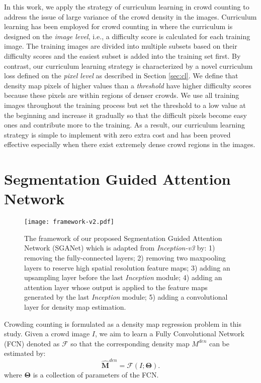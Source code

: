\documentclass[journal,comsoc]{IEEEtran}
\begin{document}
In this work, we apply the strategy of curriculum learning in crowd counting to address the issue of large variance of the crowd density in the images. Curriculum learning has been employed for crowd counting in \cite{liu2019point} where the curriculum is designed on the \textit{image level}, i.e., a difficulty score is calculated for each training image. The training images are divided into multiple subsets based on their difficulty scores and the easiest subset is added into the training set first. By contrast, our curriculum learning strategy is characterized by a novel curriculum loss defined on the \textit{pixel level} as described in Section \ref{sec:cl}. We define that density map pixels of higher values than a \textit{threshold} have higher difficulty scores because these pixels are within regions of denser crowds. We use all training images throughout the training process but set the threshold to a low value at the beginning and increase it gradually so that the difficult pixels become easy ones and contribute more to the training. 
As a result, our curriculum learning strategy is simple to implement with zero extra cost and has been proved effective especially when there exist extremely dense crowd regions in the images.

\section{Segmentation Guided Attention Network}\label{sec:sganet}
\begin{figure*}
    \centering
    \texttt{[image: framework-v2.pdf]}
    \caption{The framework of our proposed Segmentation Guided Attention Network (SGANet) which is adapted from \textit{Inception-v3} by: 1) removing the fully-connected layers; 2) removing two maxpooling layers to reserve high spatial resolution feature maps; 3) adding an upsampling layer before the last \textit{Inception} module; 4) adding an attention layer whose output is applied to the feature maps generated by the last \textit{Inception} module; 5) adding a convolutional layer for density map estimation.}
    \label{fig:framework}
\end{figure*}

Crowding counting is formulated as a density map regression problem in this study. Given a crowd image $I$, we aim to learn a Fully Convolutional Network (FCN) denoted as $\mathcal{F}$ so that the corresponding density map $M^{den}$ can be estimated by:
\begin{equation}
    \label{eq:fcn}
    \hat{\bm{M}}^{den} = \mathcal{F}(I;\bm{\Theta}).
\end{equation}
where $\bm{\Theta}$ is a collection of parameters of the FCN.
\end{document}
